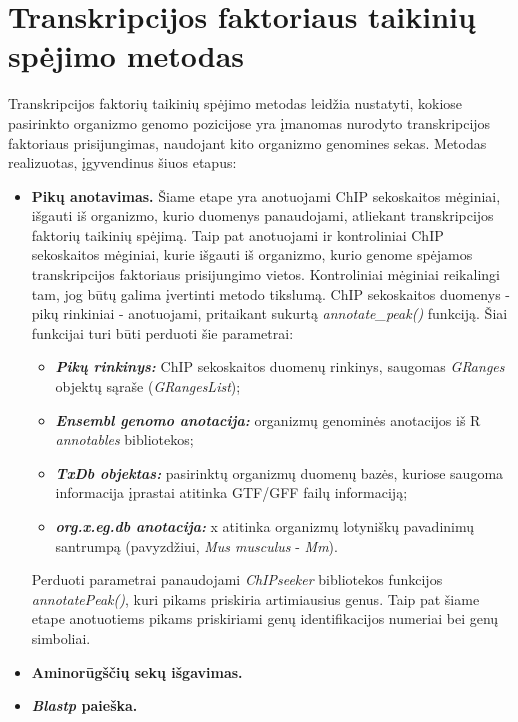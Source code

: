 \documentclass[12pt]{article}
\begin{document}
\newpage

\section{Transkripcijos faktoriaus taikinių spėjimo metodas}
Transkripcijos faktorių taikinių spėjimo metodas leidžia nustatyti, kokiose
pasirinkto organizmo genomo pozicijose yra įmanomas nurodyto transkripcijos
faktoriaus prisijungimas, naudojant kito organizmo genomines sekas. Metodas
realizuotas, įgyvendinus šiuos etapus:

\begin{itemize}
    \item \textbf{Pikų anotavimas.} Šiame etape yra anotuojami ChIP sekoskaitos
        mėginiai, išgauti iš organizmo, kurio duomenys panaudojami, atliekant
        transkripcijos faktorių taikinių spėjimą. Taip pat anotuojami ir
        kontroliniai ChIP sekoskaitos mėginiai, kurie išgauti iš organizmo,
        kurio genome spėjamos transkripcijos faktoriaus prisijungimo vietos.
        Kontroliniai mėginiai reikalingi tam, jog būtų galima įvertinti
        metodo tikslumą. ChIP sekoskaitos duomenys - pikų rinkiniai -
        anotuojami, pritaikant sukurtą \emph{annotate\_peak()} funkciją. Šiai
        funkcijai turi būti perduoti šie parametrai:
            \begin{itemize}
                \item \textbf{\emph{Pikų rinkinys:}} ChIP sekoskaitos duomenų
                    rinkinys, saugomas \emph{GRanges} objektų sąraše
                    (\emph{GRangesList});
                \item \textbf{\emph{Ensembl genomo anotacija:}} organizmų
                    genominės anotacijos iš R \emph{annotables} bibliotekos;
                \item \textbf{\emph{TxDb objektas:}} pasirinktų organizmų
                    duomenų bazės, kuriose saugoma informacija įprastai atitinka
                    GTF/GFF failų informaciją;
                \item \textbf{\emph{org.x.eg.db anotacija:}} x atitinka
                    organizmų lotyniškų pavadinimų santrumpą (pavyzdžiui,
                    \emph{Mus musculus} - \emph{Mm}).
            \end{itemize}
        Perduoti parametrai panaudojami \emph{ChIPseeker} bibliotekos
        funkcijos \emph{annotatePeak()}, kuri pikams priskiria artimiausius
        genus. Taip pat šiame etape anotuotiems pikams priskiriami genų
        identifikacijos numeriai bei genų simboliai.
    \item \textbf{Aminorūgščių sekų išgavimas.}
    \item \textbf{\emph{Blastp} paieška.}
\end{itemize}
\end{document}
